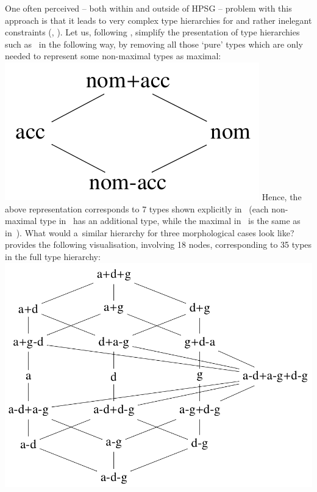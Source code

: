 \documentclass[output=paper]{langsci/langscibook}
\begin{document}
One often perceived – both within and outside of HPSG – problem with this approach is that it leads to very complex type hierarchies for  and rather inelegant constraints (\citealt[272]{sag:02}, \citealt[63–66]{dal:kin:sad:09}).  Let us, following \citealt{dani:01}, simplify the presentation of type hierarchies such as~ in the following way, by removing all those `pure’ types which are only needed to represent some non-maximal types as maximal:
\ea
\label{daniels21} \mbox{}\\\includegraphics[scale=.35]{figures/daniels21.png}
\z
Hence, the above representation corresponds to 7 types shown explicitly in~ (each non-maximal type in~ has an additional  type, while the maximal  in~ is the same as  in~).  What would a~similar hierarchy for three morphological cases look like?  \citealt[143]{dani:01} provides the following visualisation, involving 18 nodes, corresponding to 35 types in the full type hierarchy:
\ea
\label{daniels22} \mbox{}\\\includegraphics[scale=.35]{figures/daniels22.png}
\end{document}
